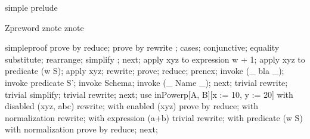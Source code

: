\begin{zsection}
   \SECTION simple \parents prelude
\end{zsection}

Zpreword znote znote  %

\begin{zproof}{simpleproof}
prove     by
                  reduce;
prove by rewrite ; %
cases;
  conjunctive;
  equality substitute;
  rearrange;
  simplify ;
next;
  apply xyz to expression w + 1;
  apply xyz to predicate (w \in S);
  apply xyz; %
  rewrite;
  prove;
  reduce;
  prenex;
  invoke (\_ bla \_);
  invoke predicate S';
  invoke Schema;
  invoke (\_ Name \_);
next;
  trivial rewrite;
  trivial simplify;
  trivial rewrite;
next;
  use inPowerp[A, B][x := 10, y := 20]
  with disabled (xyz, abc) rewrite;
  with enabled (xyz) prove by reduce;
  with normalization rewrite;
  with expression (a+b) trivial rewrite;
  with predicate (w \in S)
    with normalization prove by reduce;
next;
\end{zproof}

